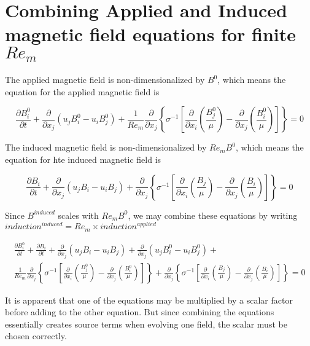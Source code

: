 \documentclass[11pt]{article}
\newcommand{\PD}{\partial}
\newcommand{\SII}{\sigma^{-1}}
\begin{document}
\section{Combining Applied and Induced magnetic field equations for finite \texorpdfstring{$Re_m$}{LG}}

The applied magnetic field is non-dimensionalized by $B^0$, which means the equation for the applied magnetic field is

\begin{equation}
	\frac{\PD B_i^0}{\PD t} 
	+ \frac{\PD}{\PD x_j} (u_j B_i^0 - u_i B_j^0) 
	+ \frac{1}{Re_m}
	\frac{\PD}{\PD x_j} 
	\left\{ \SII 
	\left[ 
	\frac{\PD}{\PD x_i} 
	\left( \frac{B_j^0}{\mu} \right) - 
	\frac{\PD}{\PD x_j} 
	\left( \frac{B_i^0}{\mu} \right)
	\right]
	\right\} = 0
\end{equation}

The induced magnetic field is non-dimensionalized by $Re_m B^0$, which means the equation for hte induced magnetic field is


\begin{equation}
	\frac{\PD B_i}{\PD t} 
	+ \frac{\PD}{\PD x_j} (u_j B_i - u_i B_j) 
	+
	\frac{\PD}{\PD x_j} 
	\left\{ \SII 
	\left[ 
	\frac{\PD}{\PD x_i} 
	\left( \frac{B_j}{\mu} \right) - 
	\frac{\PD}{\PD x_j} 
	\left( \frac{B_i}{\mu} \right)
	\right]
	\right\} = 0
\end{equation}

Since $B^{induced}$ scales with $Re_m B^0$, we may combine these equations by writing $induction^{induced}=Re_m \times induction^{applied}$

\begin{multline}
	\frac{\PD B_i^0}{\PD t} +
	\frac{\PD B_i}{\PD t} 
	+ \frac{\PD}{\PD x_j} (u_j B_i - u_i B_j) 
	+ \frac{\PD}{\PD x_j} (u_j B_i^0 - u_i B_j^0) 
	+ \\
	\frac{1}{Re_m}
	\frac{\PD}{\PD x_j} 
	\left\{ \SII 
	\left[ 
	\frac{\PD}{\PD x_i} 
	\left( \frac{B_j^0}{\mu} \right) - 
	\frac{\PD}{\PD x_j} 
	\left( \frac{B_i^0}{\mu} \right)
	\right]
	\right\} 
	+
	\frac{\PD}{\PD x_j} 
	\left\{ \SII 
	\left[ 
	\frac{\PD}{\PD x_i} 
	\left( \frac{B_j}{\mu} \right) - 
	\frac{\PD}{\PD x_j} 
	\left( \frac{B_i}{\mu} \right)
	\right]
	\right\}
	= 0
\end{multline}

It is apparent that one of the equations may be multiplied by a scalar factor before adding to the other equation. But since combining the equations essentially creates source terms when evolving one field, the scalar must be chosen correctly.
\end{document}
